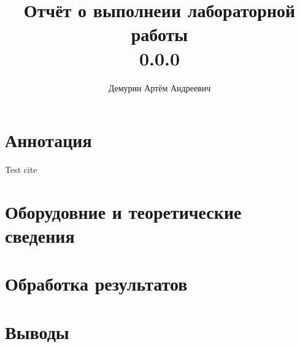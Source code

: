 \documentclass[12pt,a4paper]{article}
\author{Демурин Артём Андреевич}
\title{ \textbf{Отчёт о выполнеии лабораторной работы} \\ 0.0.0}
\date{}
\begin{document}
\maketitle


\newpage
\section{Аннотация}

Test cite \cite{julia:2017}

\newpage
\section{Оборудовние и теоретические сведения}

\newpage
\section{Обработка результатов}

\newpage
\section{Выводы}

\printbibliography
\end{document}
